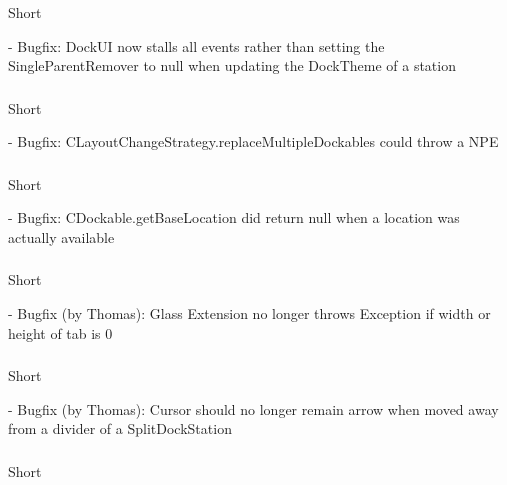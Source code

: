 \documentclass[a4paper,10pt]{article}
\newcommand{\short}{\item[Short]}
\begin{document}
\subsubsection{}
\begin{description}
 \short 
\end{description}
- Bugfix: DockUI now stalls all events rather than setting the SingleParentRemover to null when updating the DockTheme of a station
\subsubsection{}
\begin{description}
 \short 
\end{description}
- Bugfix: CLayoutChangeStrategy.replaceMultipleDockables could throw a NPE
\subsubsection{}
\begin{description}
 \short 
\end{description}
- Bugfix: CDockable.getBaseLocation did return null when a location was actually available
\subsubsection{}
\begin{description}
 \short 
\end{description}
- Bugfix (by Thomas): Glass Extension no longer throws Exception if width or height of tab is 0
\subsubsection{}
\begin{description}
 \short 
\end{description}
- Bugfix (by Thomas): Cursor should no longer remain arrow when moved away from a divider of a SplitDockStation
\subsubsection{}
\begin{description}
 \short 
\end{description}
\end{document}
